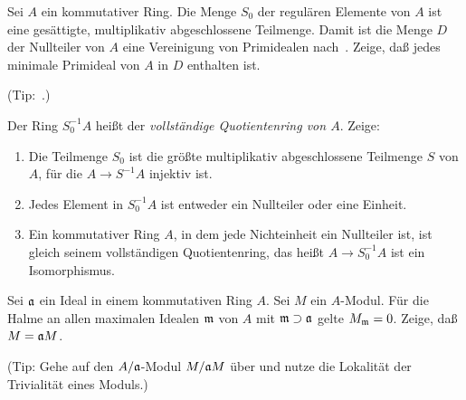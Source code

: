 \begin{exercise}
	Sei \(A\) ein kommutativer Ring. Die Menge \(S_0\) der regulären Elemente von \(A\) ist eine
	gesättigte, multiplikativ abgeschlossene Teilmenge. Damit ist die Menge \(D\) der Nullteiler von \(A\)
	eine Vereinigung von Primidealen nach~. Zeige, daß jedes minimale Primideal
	von \(A\) in \(D\) enthalten ist.
	
	(Tip:~.)
	
	Der Ring \(S_0^{-1} A\) heißt der \emph{vollständige Quotientenring von \(A\)}. Zeige:
	\begin{enumerate}
	\item
		Die Teilmenge \(S_0\) ist die größte multiplikativ abgeschlossene Teilmenge \(S\) von \(A\), 
		für die \(A \to S^{-1} A\) injektiv ist.
	\item
		Jedes Element in \(S_0^{-1} A\) ist entweder ein Nullteiler oder eine Einheit.
	\item	
		Ein kommutativer Ring \(A\), in dem jede Nichteinheit ein Nullteiler ist, ist gleich
		seinem vollständigen Quotientenring, das heißt \(A \to S^{-1}_0 A\) ist ein Isomorphismus.
	\end{enumerate}
\end{exercise}

\begin{exercise}
	\label{exer:trivial_stalks_in_closed_subset}
	Sei \(\mathfrak{a}\) ein Ideal in einem kommutativen Ring \(A\). Sei \(M\) ein \(A\)-Modul. Für die Halme an
	allen maximalen Idealen \(\mathfrak{m}\) von \(A\) mit \(\mathfrak{m} \supset \mathfrak{a}\) gelte \(M_{\mathfrak{m}} = 0\). Zeige,
	daß \(M = \mathfrak{a} M\).
	
	(Tip: Gehe auf den \(A/\mathfrak{a}\)-Modul \(M/\mathfrak{a} M\) über und nutze die Lokalität der Trivialität eines Moduls.)
\end{exercise}

